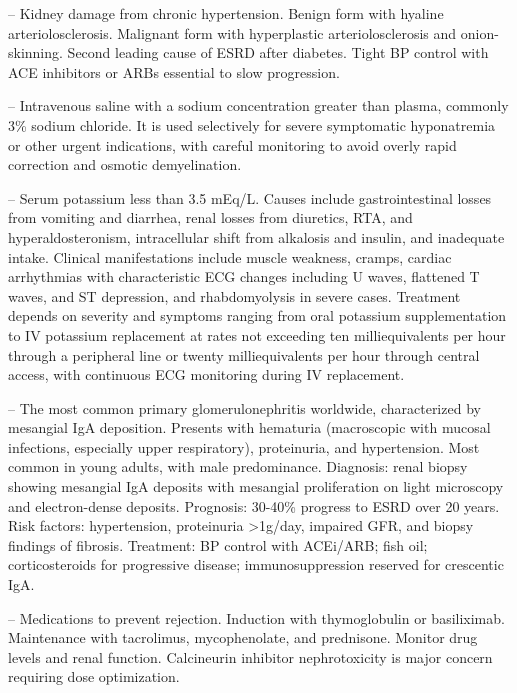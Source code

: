 -- Kidney damage from chronic hypertension. Benign form with hyaline arteriolosclerosis. Malignant form with hyperplastic arteriolosclerosis and onion-skinning. Second leading cause of ESRD after diabetes. Tight BP control with ACE inhibitors or ARBs essential to slow progression.

-- Intravenous saline with a sodium concentration greater than plasma, commonly 3\% sodium chloride. It is used selectively for severe symptomatic hyponatremia or other urgent indications, with careful monitoring to avoid overly rapid correction and osmotic demyelination.

-- Serum potassium less than 3.5 mEq/L. Causes include gastrointestinal losses from vomiting and diarrhea, renal losses from diuretics, RTA, and hyperaldosteronism, intracellular shift from alkalosis and insulin, and inadequate intake. Clinical manifestations include muscle weakness, cramps, cardiac arrhythmias with characteristic ECG changes including U waves, flattened T waves, and ST depression, and rhabdomyolysis in severe cases. Treatment depends on severity and symptoms ranging from oral potassium supplementation to IV potassium replacement at rates not exceeding ten milliequivalents per hour through a peripheral line or twenty milliequivalents per hour through central access, with continuous ECG monitoring during IV replacement.

-- The most common primary glomerulonephritis worldwide, characterized by mesangial IgA deposition. Presents with hematuria (macroscopic with mucosal infections, especially upper respiratory), proteinuria, and hypertension. Most common in young adults, with male predominance. Diagnosis: renal biopsy showing mesangial IgA deposits with mesangial proliferation on light microscopy and electron-dense deposits. Prognosis: 30-40\% progress to ESRD over 20 years. Risk factors: hypertension, proteinuria >1g/day, impaired GFR, and biopsy findings of fibrosis. Treatment: BP control with ACEi/ARB; fish oil; corticosteroids for progressive disease; immunosuppression reserved for crescentic IgA.

-- Medications to prevent rejection. Induction with thymoglobulin or basiliximab. Maintenance with tacrolimus, mycophenolate, and prednisone. Monitor drug levels and renal function. Calcineurin inhibitor nephrotoxicity is major concern requiring dose optimization.

